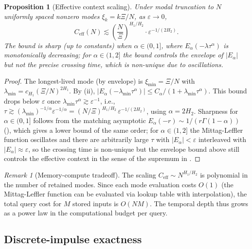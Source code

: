 \documentclass[11pt]{article}
\newtheorem{proposition}[theorem]{Proposition}
\theoremstyle{definition}
\theoremstyle{remark}
\newtheorem{remark}[theorem]{Remark}
\begin{document}
\begin{proposition}[Effective context scaling]
\label{thm:eff_context}
Under modal truncation to $N$ uniformly spaced
nonzero modes $\xi_k = k\Xi/N$, as $\varepsilon \to 0$,
\begin{equation}\label{eq:eff_context}
C_{\mathrm{eff}}(N) \lesssim
\left(\frac{N}{\Xi}\right)^{H_1/H_2}
\cdot \varepsilon^{-1/(2H_2)}.
\end{equation}
The bound is sharp (up to constants) when
$\alpha \in (0, 1]$, where
$E_\alpha(-\lambda \tau^\alpha)$ is monotonically
decreasing; for $\alpha \in (1, 2]$ the bound
controls the envelope of $|E_\alpha|$ but not the
precise crossing time, which is non-unique due to
oscillations.
\end{proposition}

\begin{proof}
The longest-lived mode (by envelope) is
$\xi_{\min} = \Xi/N$ with
$\lambda_{\min} = c_{H_1}(\Xi/N)^{2H_1}$.
By (ii),
$|E_\alpha(-\lambda_{\min}\tau^\alpha)|
\leq C_\alpha/(1 + \lambda_{\min}\tau^\alpha)$.
This bound drops below $\varepsilon$ once
$\lambda_{\min}\tau^\alpha \gtrsim
\varepsilon^{-1}$, i.e.,
$\tau \gtrsim (\lambda_{\min})^{-1/\alpha}
\varepsilon^{-1/\alpha}
= (N/\Xi)^{H_1/H_2}\,\varepsilon^{-1/(2H_2)}$,
using $\alpha = 2H_2$.  Sharpness for $\alpha \in
(0, 1]$ follows from the matching asymptotic
$E_\alpha(-r) \sim 1/(r\Gamma(1-\alpha))$
(\cite[Ch.~4]{gorenflo2014}), which gives a lower
bound of the same order; for $\alpha \in (1, 2]$
the Mittag-Leffler function oscillates and there
are arbitrarily large $\tau$ with $|E_\alpha| <
\varepsilon$ interleaved with $|E_\alpha| \approx
\varepsilon$, so the crossing time is non-unique
but the envelope bound above still controls the
effective context in the sense of the
supremum in .
\end{proof}

\begin{remark}[Memory-compute tradeoff]
\label{rem:memory_compute}
The scaling $C_{\mathrm{eff}} \sim N^{H_1/H_2}$ is
polynomial in the number of retained modes.  Since
each mode evaluation costs $O(1)$ (the Mittag-Leffler
function can be evaluated via lookup table with
interpolation), the total query cost for $M$ stored
inputs is $O(NM)$.  The temporal depth thus grows as
a power law in the computational budget per query.
\end{remark}

\subsection{Discrete-impulse exactness}
\end{document}
